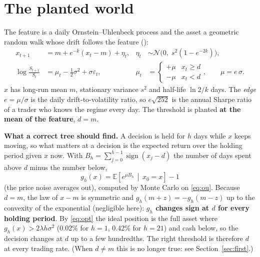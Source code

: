 \documentclass[11pt,a4paper]{article}
\newcommand{\code}[1]{\texttt{\detokenize{#1}}}
\newcommand{\E}{\mathbb{E}}
\newcommand{\1}{\mathbf{1}}
\begin{document}
\section{The planted world}\label{sec:world}
The feature is a daily Ornstein--Uhlenbeck process and the asset a geometric random walk whose drift follows the feature (\code{synthetic_market.py}):
\begin{align}
x_{t+1}&=m+e^{-k}(x_t-m)+\eta_t, & \eta_t&\sim\mathcal N\!\big(0,\;s^2(1-e^{-2k})\big),\label{eq:ou}\\
\log\frac{S_{t+1}}{S_t}&=\mu_t-\tfrac12\sigma^2+\sigma\varepsilon_t, & \mu_t&=\begin{cases}+\mu & x_t\ge d\\ -\mu & x_t<d\end{cases},\qquad \mu=e\,\sigma.\label{eq:price}
\end{align}
$x$ has long-run mean $m$, stationary variance $s^2$ and half-life $\ln2/k$ days. The \emph{edge} $e=\mu/\sigma$ is the daily drift-to-volatility ratio, so $e\sqrt{252}$ is the annual Sharpe ratio of a trader who knows the regime every day. The threshold is planted \textbf{at the mean of the feature}, $d=m$.

\textbf{What a correct tree should find.} A decision is held for $h$ days while $x$ keeps moving, so what matters at a decision is the expected return over the holding period given $x$ now. With $B_h=\sum_{j=0}^{h-1}\operatorname{sign}(x_j-d)$ the number of days spent above $d$ minus the number below,
\begin{equation}\label{eq:g}
g_h(x)=\E\!\left[e^{\mu B_h}\,\middle|\,x_0=x\right]-1
\end{equation}
(the price noise averages out), computed by Monte Carlo on \eqref{eq:ou}. Because $d=m$, the law of $x-m$ is symmetric and $g_h(m+z)=-g_h(m-z)$ up to the convexity of the exponential (negligible here): \textbf{$g_h$ changes sign at $d$ for every holding period}. By \eqref{eq:opt} the ideal position is the full asset where $g_h(x)>2\lambda h\sigma^2$ (0.02\% for $h=1$, 0.42\% for $h=21$) and cash below, so the decision changes at $d$ up to a few hundredths. The right threshold is therefore $d$ at every trading rate. (When $d\neq m$ this is no longer true: see Section~\ref{sec:first}.)
\end{document}
